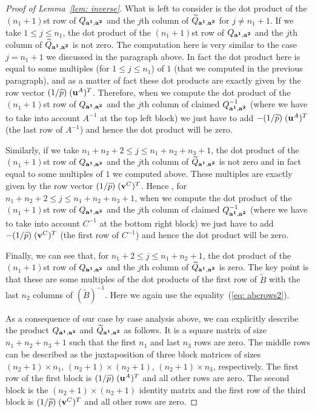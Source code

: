 \documentclass[10pt,a4paper]{amsart}
\begin{document}
\begin{proof} [Proof of Lemma~\ref{lem: inverse}]
What is left to consider is the dot product of the  $(n_1+1)$st  row of $Q_{{\bf a^1}, {\bf a^2}}$ and the  $j$th column of  $\widetilde{Q}_{{\bf a^1}, {\bf a^2}}$ for  $j \neq n_1+1$. If we take $1 \leq j \leq n_1$, the dot product of the $(n_1+1)$st row of $Q_{{\bf a^1}, {\bf a^2}}$  and the $j$th column of $\widetilde{Q}_{{\bf a^1}, {\bf a^2}}$ is not zero. The computation here is very similar to the case $j=n_1+1$ we discussed in the paragraph above. In fact the dot product here is equal to some multiples (for $1 \leq j \leq n_1$) of $1$ (that we  computed in the previous paragraph), and as a matter of fact  these dot products are exactly given by the row vector $(1/\widetilde{p})\; ({\bf u}^A)^T$. Therefore,  when we compute the dot product  of the $(n_1+1)$st  row of $Q_{{\bf a^1}, {\bf a^2}}$  and 
the $j$th column of claimed $Q_{{\bf a^1}, {\bf a^2}}^{-1}$ (where we have to take into account $A^{-1}$ at the top left block) we just have to add $-(1/\widetilde{p})\; ({\bf u}^A)^T$ (the last row of $A^{-1}$) and hence the dot product will be zero.  

Similarly, if we take $n_1+n_2+2 \leq j \leq n_1+n_2+n_3+1$, the dot product of the $(n_1+1)$st row of $Q_{{\bf a^1}, {\bf a^2}}$  and the $j$th column of $\widetilde{Q}_{{\bf a^1}, {\bf a^2}}$ is not zero and in fact equal to some multiples of $1$ we computed above. These multiples are exactly given by the row vector $(1/\widetilde{p})\; ({\bf v}^C)^T$. Hence ,  for $n_1+n_2+2 \leq j \leq n_1+n_2+n_3+1$, when we compute the dot product  of the $(n_1+1)$st row of $Q_{{\bf a^1}, {\bf a^2}}$  and the $j$th column of claimed $Q_{{\bf a^1}, {\bf a^2}}^{-1}$ (where we have to take into account $C^{-1}$ at the bottom right block) we just have to add $-(1/\widetilde{p})\; ({\bf v}^C)^T$ (the first row of $C^{-1}$) and hence the dot product will be zero.  

Finally, we can see that, for  $n_1+2 \leq j \leq n_1+n_2+1$, the dot product of the $(n_1+1)$st row of $Q_{{\bf a^1}, {\bf a^2}}$  and the $j$th column of $\widetilde{Q}_{{\bf a^1}, {\bf a^2}}$ 
 is zero. The key point is that these are some multiples of  the dot products of the first row of $\widetilde{B}$ with the last $n_2$ columns of $(\widetilde{B})^{-1}$. Here we again use  the equality~(\ref{eq: abcrows2}). 

As a consequence of our case by case analysis  above,  we can explicitly describe the product $Q_{{\bf a^1}, {\bf a^2}}$ and $\widetilde{Q}_{{\bf a^1}, {\bf a^2}}$ as follows. It is a square matrix of size $n_1+n_2+n_3+1$ such that the first $n_1$ and last $n_3$ rows are zero. The middle rows can be described as the juxtaposition of    three block matrices of sizes $(n_2+1) \times n_1$,  $(n_2+1) \times (n_2+1)$, $(n_2+1) \times n_3$, respectively.  The first row of the first block is $(1/\widetilde{p})\; ({\bf u}^A)^T$ and all other rows are zero. The second block is the $(n_2+1) \times (n_2+1)$ identity matrix and the first row of the third block is 
$(1/\widetilde{p})\; ({\bf v}^C)^T$ and all other rows are zero.


\end{proof}
\end{document}
